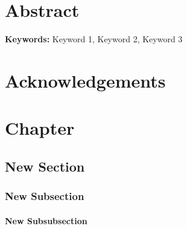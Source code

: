 \documentclass[10pt]{report}
\numberwithin{figure}{section}
\numberwithin{table}{section}
\begin{document}
\newpage
\listoftables 
{} %



\newpage
\chapter*{Abstract} %
\blindtext
\newline
\newline
\textbf{Keywords:} Keyword 1, Keyword 2, Keyword 3



\newpage
\chapter*{Acknowledgements}
\blindtext 




\newpage
\chapter{Chapter}
\label{chapterlabel}

\blindtext
\newline 
\blindtext



\newpage




\newpage
\section{New Section}
\subsection{New Subsection} 
\subsubsection{New Subsubsection} 
\end{document}
